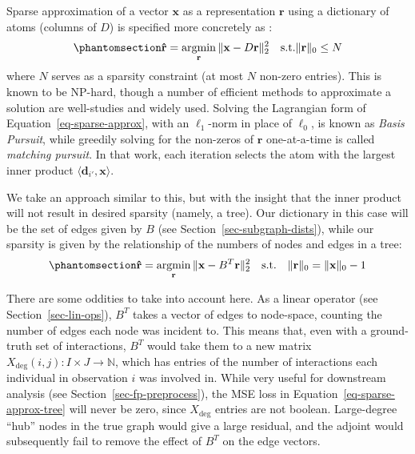 \documentclass[%
	12pt,
		oneside,
		letterpaper
]{book}
\begin{document}
Sparse approximation of a vector \(\mathbf{x}\) as a representation
\(\mathbf{r}\) using a dictionary of atoms (columns of \(D\)) is
specified more concretely as
\autocite{EfficientimplementationK_Rubinstein2008}:
\begin{equation}\phantomsection\label{eq-sparse-approx}{\mathbf{\hat{r}} = \operatorname*{argmin}_{\mathbf{r}}{\|\mathbf{x}-D\mathbf{r} \|_2^2} \quad \text{s.t.} \|\mathbf{r}\|_0\leq N }\end{equation}
where \(N\) serves as a sparsity constraint (at most \(N\) non-zero
entries). This is known to be NP-hard, though a number of efficient
methods to approximate a solution are well-studies and widely used.
Solving the Lagrangian form of Equation~\ref{eq-sparse-approx}, with an
\(\ell_1\)-norm in place of \(\ell_0\), is known as \emph{Basis
Pursuit}\autocite{SparseApproximateSolutions_Natarajan1995}, while
greedily solving for the non-zeros of \(\mathbf{r}\) one-at-a-time is
called \emph{matching
pursuit}\autocite{Matchingpursuitstime_Mallat1993}. In that work, each
iteration selects the atom with the largest inner product
\(\langle \mathbf{d}_{i'},\mathbf{x}\rangle\).

We take an approach similar to this, but with the insight that the inner
product will not result in desired sparsity (namely, a tree). Our
dictionary in this case will be the set of edges given by \(B\) (see
Section~\ref{sec-subgraph-dists}), while our sparsity is given by the
relationship of the numbers of nodes and edges in a tree:
\begin{equation}\phantomsection\label{eq-sparse-approx-tree}{
\mathbf{\hat{r}} = \operatorname*{argmin}_{\mathbf{r}}{\|\mathbf{x}-B^T\mathbf{r} \|_2^2} \quad \text{s.t.}\quad \|\mathbf{r}\|_0 = \|\mathbf{x}\|_0 - 1
}\end{equation}

There are some oddities to take into account here. As a linear operator
(see Section~\ref{sec-lin-ops}), \(B^T\) takes a vector of edges to
node-space, counting the number of edges each node was incident to. This
means that, even with a ground-truth set of interactions, \(B^T\) would
take them to a new matrix
\(X_{\text{deg}}(i,j):I\times J \rightarrow \mathbb{N}\), which has
entries of the number of interactions each individual in observation
\(i\) was involved in. While very useful for downstream analysis (see
Section~\ref{sec-fp-preprocess}), the MSE loss in
Equation~\ref{eq-sparse-approx-tree} will never be zero, since
\(X_{\text{deg}}\) entries are not boolean. Large-degree ``hub'' nodes
in the true graph would give a large residual, and the adjoint would
subsequently fail to remove the effect of \(B^T\) on the edge vectors.
\end{document}
